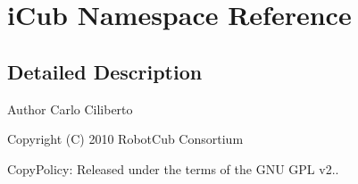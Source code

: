 \section{i\+Cub Namespace Reference}
\label{namespaceiCub}


\subsection{Detailed Description}
\begin{DoxyAuthor}{Author}
Carlo Ciliberto
\end{DoxyAuthor}
Copyright (C) 2010 Robot\+Cub Consortium

Copy\+Policy\+: Released under the terms of the G\+N\+U G\+P\+L v2.. 